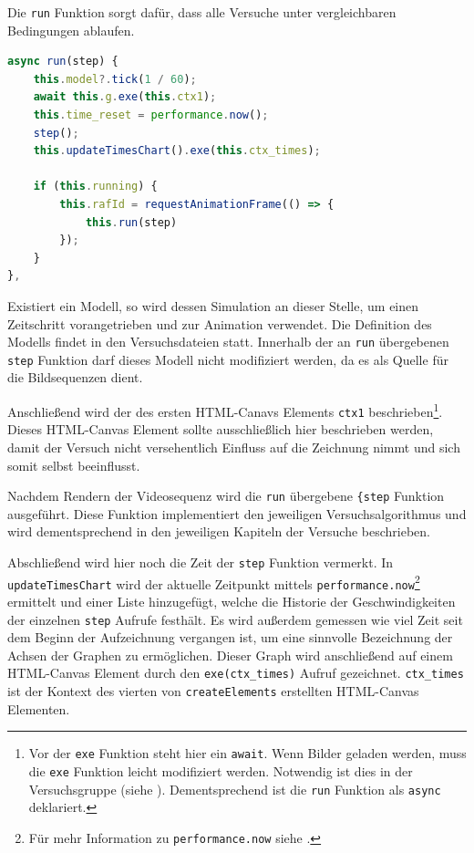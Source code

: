 Die \lstinline{run} Funktion sorgt dafür, dass alle Versuche unter vergleichbaren Bedingungen ablaufen.

\begin{lstlisting}[language=JavaScript, caption={Definition der \lstinline{simulation.run} Funktion.}, label={lst:sim_run}]
async run(step) {
    this.model?.tick(1 / 60);
    await this.g.exe(this.ctx1);
    this.time_reset = performance.now();
    step();
    this.updateTimesChart().exe(this.ctx_times);

    if (this.running) {
        this.rafId = requestAnimationFrame(() => {
            this.run(step)
        });
    }
},
\end{lstlisting}

Existiert ein  Modell, so wird dessen Simulation an dieser Stelle, um einen Zeitschritt vorangetrieben und zur Animation verwendet.
Die Definition des  Modells findet in den Versuchsdateien statt.
Innerhalb der an \lstinline{run} übergebenen \lstinline{step} Funktion darf dieses Modell nicht modifiziert werden, da es als Quelle für die Bildsequenzen dient.

Anschlie{\ss}end wird der  des ersten  HTML-Canavs Elements \lstinline{ctx1} beschrieben\footnote{Vor der \lstinline{exe} Funktion steht hier ein \lstinline{await}. Wenn Bilder geladen werden, muss die \lstinline{exe} Funktion leicht modifiziert werden. Notwendig ist dies in der Versuchsgruppe  (siehe ).
Dementsprechend ist die \lstinline{run} Funktion als \lstinline{async} deklariert.}.
Dieses HTML-Canvas Element sollte ausschlie{\ss}lich hier beschrieben werden, damit der Versuch nicht versehentlich Einfluss auf die Zeichnung nimmt und sich somit selbst beeinflusst.

Nachdem Rendern der Videosequenz wird die \lstinline{run} übergebene \lstinline{{step} Funktion ausgeführt.
Diese Funktion implementiert den jeweiligen Versuchsalgorithmus und wird dementsprechend in den jeweiligen Kapiteln der Versuche beschrieben.

Abschlie{\ss}end wird hier noch die Zeit der \lstinline{step} Funktion vermerkt.
In \lstinline{updateTimesChart} wird der aktuelle Zeitpunkt mittels \lstinline{performance.now}\footnote{Für mehr Information zu \lstinline{performance.now} siehe .} ermittelt und einer Liste hinzugefügt, welche die Historie der Geschwindigkeiten der einzelnen \lstinline{step} Aufrufe festhält.
Es wird au{\ss}erdem gemessen wie viel Zeit seit dem Beginn der Aufzeichnung vergangen ist, um eine sinnvolle Bezeichnung der Achsen der Graphen zu ermöglichen.
Dieser Graph wird anschlie{\ss}end auf einem HTML-Canvas Element durch den \lstinline{exe(ctx_times)} Aufruf gezeichnet.
\lstinline{ctx_times} ist der Kontext des vierten von \lstinline{createElements} erstellten HTML-Canvas Elementen.

